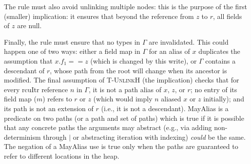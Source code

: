 The rule must also avoid unlinking multiple nodes: this is the purpose of the first (smaller) implication: it ensures that beyond the reference from $z$ to $r$, all fields of $z$ are null.

Finally, the rule must ensure that no types in $\Gamma$ are invalidated.  This could happen one of two ways: either a field map in $\Gamma$ for an alias of $x$ duplicates the assumption that $x.f_1==z$ (which is changed by this write), or $\Gamma$ contains a descendant of $r$, whose path from the root will change when its ancestor is modified.
The final assumption of \textsc{T-UnlinkH} (the implication)
checks that for every \textsf{rcuItr} reference $n$ in $\Gamma$, it is not a path alias of $x$, $z$, or $r$; no entry of its field map ($m$) refers to $r$ or $z$ (which would imply $n$ aliased $x$ or $z$ initially); and its path is not an extension of $r$ (i.e., it is not a descendant).
\textsf{MayAlias} is a predicate on two paths (or a path and set of paths) which is true if it is possible that any concrete paths the arguments may abstract (e.g., via adding non-determinism through $|$ or abstracting iteration with indexing) \emph{could} be the same.  The negation of a \textsf{MayAlias} use is true only when the paths are guaranteed to refer to different locations in the heap.

